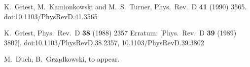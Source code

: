 \documentclass[12pt,twoside]{article}
\begin{document}
\begin{thebibliography}{99}
  K.~Griest, M.~Kamionkowski and M.~S.~Turner,
  Phys.\ Rev.\ D {\bf 41} (1990) 3565.
  doi:10.1103/PhysRevD.41.3565

  K.~Griest,
  Phys.\ Rev.\ D {\bf 38} (1988) 2357
   Erratum: [Phys.\ Rev.\ D {\bf 39} (1989) 3802].
  doi:10.1103/PhysRevD.38.2357, 10.1103/PhysRevD.39.3802

  M.~Duch, B.~Grz\k{a}dkowski,
  to appear.
  
\end{thebibliography}
\end{document}
